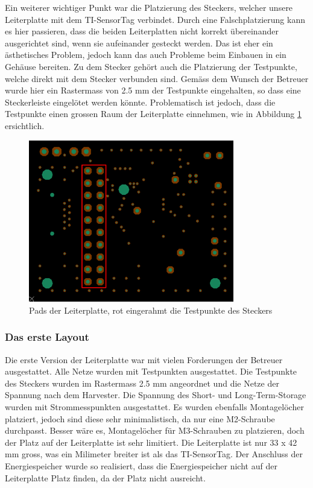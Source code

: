 Ein weiterer wichtiger Punkt war die Platzierung des Steckers, welcher unsere Leiterplatte mit dem TI-SensorTag verbindet. Durch eine Falschplatzierung kann es hier passieren, dass die beiden Leiterplatten nicht korrekt übereinander ausgerichtet sind, wenn sie aufeinander gesteckt werden. Das ist eher ein ästhetisches Problem, jedoch kann das auch Probleme beim Einbauen in ein Gehäuse bereiten. Zu dem Stecker gehört auch die Platzierung der Testpunkte, welche direkt mit dem Stecker verbunden sind. Gemäss dem Wunsch der Betreuer wurde hier ein Rastermass von 2.5 mm der Testpunkte eingehalten, so dass eine Steckerleiste eingelötet werden könnte. Problematisch ist jedoch, dass die Testpunkte einen grossen Raum der Leiterplatte einnehmen, wie in Abbildung \ref{layout_testpunkteraster} ersichtlich.

\begin{figure}[ht]
    \includegraphics[width=0.8\textwidth]{3Vorgehen/imag/Layout_Testpunkteraster.png}
    \caption{Pads der Leiterplatte, rot eingerahmt die Testpunkte des Steckers}\label{layout_testpunkteraster} 
\end{figure}

\subsubsection{Das erste Layout}

Die erste Version der Leiterplatte war mit vielen Forderungen der Betreuer ausgestattet. Alle Netze wurden mit Testpunkten ausgestattet. Die Testpunkte des Steckers wurden im Rastermass 2.5 mm angeordnet und die Netze der Spannung nach dem Harvester. Die Spannung des Short- und Long-Term-Storage wurden mit Strommesspunkten ausgestattet. Es wurden ebenfalls Montagelöcher platziert, jedoch sind diese sehr minimalistisch, da nur eine M2-Schraube durchpasst. Besser wäre es, Montagelöcher für M3-Schrauben zu platzieren, doch der Platz auf der Leiterplatte ist sehr limitiert. Die Leiterplatte ist nur 33 x 42 mm gross, was ein Milimeter breiter ist als das TI-SensorTag. Der Anschluss der Energiespeicher wurde so realisiert, dass die Energiespeicher nicht auf der Leiterplatte Platz finden, da der Platz nicht ausreicht.

